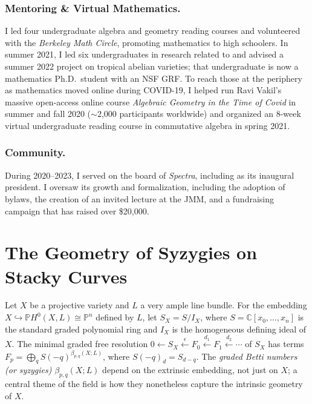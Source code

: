 \documentclass[11pt,reqno]{amsart}
\theoremstyle{remark}
\newcommand{\CC}{\mathbb{C}}
\newcommand{\PP}{\mathbb{P}}
\begin{document}
\subsubsection{Mentoring \& Virtual Mathematics.} I led four undergraduate algebra and geometry reading courses and volunteered with the \textit{Berkeley Math Circle}, promoting mathematics to high schoolers. In summer 2021, I led six undergraduates in research related to \cite{BBCMMW24} and advised a summer 2022 project on tropical abelian varieties; that undergraduate is now a mathematics Ph.D.\ student with an NSF GRF. To reach those at the periphery as mathematics moved online during COVID-19, I helped run Ravi Vakil's massive open-access online course \textit{Algebraic Geometry in the Time of Covid} in summer and fall 2020 ($\sim$2,000 participants worldwide) and organized an 8-week virtual undergraduate reading course in commutative algebra in spring 2021.

\subsubsection{Community.}  During 2020--2023, I served on the board of \textit{Spectra}, including as its inaugural president. I oversaw its growth and formalization, including the adoption of bylaws, the creation of an invited lecture at the JMM, and a fundraising campaign that has raised over \$20,000.

\section{The Geometry of Syzygies on Stacky Curves}\label{sec:syzygies-on-stacks}
Let $X$ be a projective variety and $L$ a very ample line bundle. For the embedding $X \hookrightarrow \PP H^{0}(X,L)\cong \PP^{n}$ defined by $L$, let $S_{X}=S/I_{X}$, where $S=\CC[x_{0},\ldots,x_{n}]$ is the standard graded polynomial ring and $I_{X}$ is the homogeneous defining ideal of $X$. The minimal graded free resolution $0\leftarrow S_X\xleftarrow{\,\epsilon\,}F_0\xleftarrow{\,d_1\,}F_1\xleftarrow{\,d_2\,}\cdots$ of $S_X$ has terms $F_p=\bigoplus_q S(-q)^{\beta_{p,q}(X;L)}$, where $S(-q)_d=S_{d-q}$. The \emph{graded Betti numbers (or syzygies)} $\beta_{p,q}(X;L)$ depend on the extrinsic embedding, not just on $X$; a central theme of the field is how they nonetheless capture the intrinsic geometry of $X$.
\end{document}
